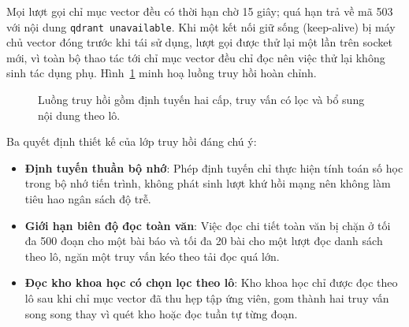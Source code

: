 Mọi lượt gọi chỉ mục vector đều có thời hạn chờ 15 giây; quá hạn trả về mã 503 với nội dung \texttt{qdrant unavailable}. Khi một kết nối giữ sống (keep-alive) bị máy chủ vector đóng trước khi tái sử dụng, lượt gọi được thử lại một lần trên socket mới, vì toàn bộ thao tác tới chỉ mục vector đều chỉ đọc nên việc thử lại không sinh tác dụng phụ. Hình~\ref{fig:luong-truy-hoi} minh hoạ luồng truy hồi hoàn chỉnh.

\begin{figure}[htbp]
    \centering
    \caption{Luồng truy hồi gồm định tuyến hai cấp, truy vấn có lọc và bổ sung nội dung theo lô.}
    \label{fig:luong-truy-hoi}
\end{figure}

Ba quyết định thiết kế của lớp truy hồi đáng chú ý:
\begin{itemize}
    \item[--] \textbf{Định tuyến thuần bộ nhớ}: Phép định tuyến chỉ thực hiện tính toán số học trong bộ nhớ tiến trình, không phát sinh lượt khứ hồi mạng nên không làm tiêu hao ngân sách độ trễ.
    \item[--] \textbf{Giới hạn biên độ đọc toàn văn}: Việc đọc chi tiết toàn văn bị chặn ở tối đa 500 đoạn cho một bài báo và tối đa 20 bài cho một lượt đọc danh sách theo lô, ngăn một truy vấn kéo theo tải đọc quá lớn.
    \item[--] \textbf{Đọc kho khoa học có chọn lọc theo lô}: Kho khoa học chỉ được đọc theo lô sau khi chỉ mục vector đã thu hẹp tập ứng viên, gom thành hai truy vấn song song thay vì quét kho hoặc đọc tuần tự từng đoạn.
\end{itemize}

